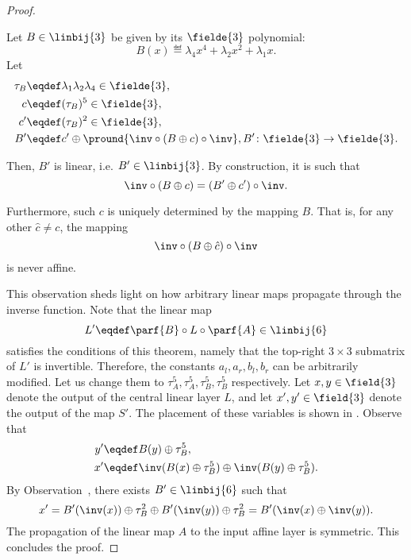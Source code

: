 \begin{proof}
\begin{observation}
Let $B \in \linbij{3}$ be given by its $\fielde{3}$ polynomial:
$$
B(x) \eqdef \lambda_4x^4 + \lambda_2x^2 +\lambda_1x.
$$
Let 
\begin{align*}
\tau_B &\eqdef \lambda_1 \lambda_2 \lambda_4 \in \fielde{3},\\
c &\eqdef (\tau_B)^5 \in \fielde{3},\\
c' &\eqdef (\tau_B)^2 \in \fielde{3},\\
B' &\eqdef c' \oplus \pround{\inv \circ (B \oplus c) \circ \inv}, B'\colon \fielde{3} \to \fielde{3}.
\end{align*}

Then, $B'$ is linear, i.e. $B' \in \linbij{3}$. By construction, it is such that
$$
\inv \circ (B\oplus c) = (B'\oplus c') \circ \inv.
$$

Furthermore, such $c$ is uniquely determined by the mapping $B$. That is, for any other $\hat{c} \ne c$, the mapping
$$
\inv \circ (B \oplus \hat{c}) \circ \inv
$$
is never affine.
\end{observation}

This observation sheds light on how arbitrary linear maps propagate through the inverse function. Note that the linear map $$
L' \eqdef \parf{B} \circ L\circ \parf{A} \in \linbij{6}
$$
satisfies the conditions of this theorem, namely that the top-right $3\times 3$ submatrix of $L'$ is invertible. Therefore, the constants $a_l,a_r,b_l,b_r$ can be arbitrarily modified. Let us change them to $\tau_A^5, \tau_A^5, \tau_B^5, \tau_B^5$ respectively. Let $x,y \in \field{3}$ denote the output of the central linear layer $L$, and let $x',y' \in \field{3}$ denote the output of the map $S'$. The placement of these variables is shown in . Observe that
\begin{align*}
    y' &\eqdef B(y) \oplus \tau_B^5, \\
    x' &\eqdef \inv(B(x) \oplus \tau_B^5) \oplus \inv(B(y) \oplus \tau_B^5).
\end{align*}
By Observation~, there exists $B' \in \linbij{6}$ such that
$$
    x' = B'(\inv(x)) \oplus \tau_B^2 \oplus B'(\inv(y)) \oplus \tau_B^2 = B'(\inv(x)\oplus \inv(y)).
$$
The propagation of the linear map $A$ to the input affine layer is symmetric. This concludes the proof.

\end{proof}


